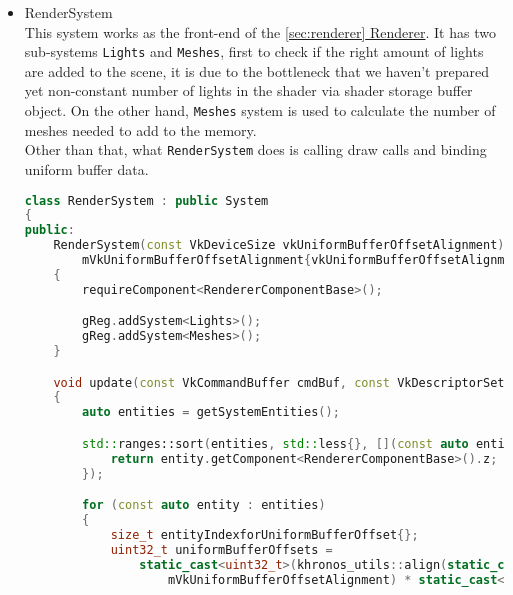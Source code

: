 \begin{itemize}
\begin{itemize}
\begin{lstlisting}[language=c++, caption=Movement code without Cyberith (./engine/src/ecs/systems/movement\_system.hpp)]
                if ((!controllerPose.isNan()) || (controllerPose == math::Vec3{0.f}))
                {
                    const math::Vec3 forward{controllers.getPose(controllerIndex)[2]};
                    player.getComponent<TransformComponent>().pos += forward * player.getComponent<RigidBodyComponent>().velocity * dt;
                }
                else
                {
                    TS_WARN(std::format("Controller no. {} can not be located.", controllerIndex).c_str());
                }
            }
        }
\end{lstlisting}
    \end{itemize}
    \item RenderSystem\\
    \label{sec:renderer_system}
    This system works as the front-end of the \hyperref[sec:renderer]{\ref*{sec:renderer} Renderer}.
    It has two sub-systems \texttt{Lights} and \texttt{Meshes}, first to check if the right amount of lights are added to the scene, it is due to the bottleneck that we haven't prepared yet non-constant number of lights in the shader via shader storage buffer object. On the other hand, \texttt{Meshes} system is used to calculate the number of meshes needed to add to the memory.\\
    Other than that, what \texttt{RenderSystem} does is calling draw calls and binding uniform buffer data.
\begin{lstlisting}[language=c++, caption=Front-end of the rendrer (./engine/src/ecs/systems/render\_system.hpp)]
class RenderSystem : public System
{
public:
    RenderSystem(const VkDeviceSize vkUniformBufferOffsetAlignment) :
        mVkUniformBufferOffsetAlignment{vkUniformBufferOffsetAlignment}
    {
        requireComponent<RendererComponentBase>();

        gReg.addSystem<Lights>();
        gReg.addSystem<Meshes>();
    }

    void update(const VkCommandBuffer cmdBuf, const VkDescriptorSet descriptorSet)
    {
        auto entities = getSystemEntities();

        std::ranges::sort(entities, std::less{}, [](const auto entity) {
            return entity.getComponent<RendererComponentBase>().z;
        });

        for (const auto entity : entities)
        {
            size_t entityIndexforUniformBufferOffset{};
            uint32_t uniformBufferOffsets = 
                static_cast<uint32_t>(khronos_utils::align(static_cast<VkDeviceSize>(sizeof(decltype(RenderProcess::mIndividualUniformData)::value_type)),
                    mVkUniformBufferOffsetAlignment) * static_cast<VkDeviceSize>(entityIndexforUniformBufferOffset));


\end{lstlisting}
\end{itemize}
